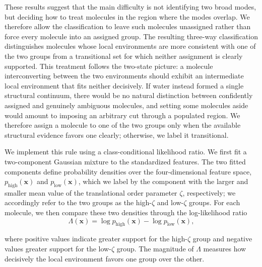 \documentclass[aps, amsmath,amssymb, reprint, twocolumn, superscriptaddress]{revtex4-2}
\begin{document}
These results suggest that the main difficulty is not identifying two broad modes, but deciding how to treat molecules in the region where the modes overlap. We therefore allow the classification to leave such molecules unassigned rather than force every molecule into an assigned group. The resulting three-way classification distinguishes molecules whose local environments are more consistent with one of the two groups from a transitional set for which neither assignment is clearly supported. This treatment follows the two-state picture: a molecule interconverting between the two environments should exhibit an intermediate local environment that fits neither decisively. If water instead formed a single structural continuum, there would be no natural distinction between confidently assigned and genuinely ambiguous molecules, and setting some molecules aside would amount to imposing an arbitrary cut through a populated region. We therefore assign a molecule to one of the two groups only when the available structural evidence favors one clearly; otherwise, we label it transitional.

We implement this rule using a class-conditional likelihood ratio. We first fit a two-component Gaussian mixture to the standardized features. The two fitted components define probability densities over the four-dimensional feature space, $p_{\mathrm{high}}(\mathbf{x})$ and $p_{\mathrm{low}}(\mathbf{x})$, which we label by the component with the larger and smaller mean value of the translational order parameter $\zeta$, respectively; we accordingly refer to the two groups as the high-$\zeta$ and low-$\zeta$ groups. For each molecule, we then compare these two densities through the log-likelihood ratio
\begin{equation}
\Lambda(\mathbf{x}) = \log p_{\mathrm{high}}(\mathbf{x}) - \log p_{\mathrm{low}}(\mathbf{x}),
\label{eq:likelihood_ratio}
\end{equation}

where positive values indicate greater support for the high-$\zeta$ group and negative values greater support for the low-$\zeta$ group. The magnitude of $\Lambda$ measures how decisively the local environment favors one group over the other.
\end{document}
